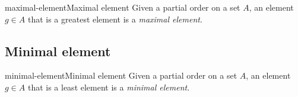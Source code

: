 \documentclass[preview]{standalone}
\begin{document}
\begin{snippetdefinition}{maximal-element}{Maximal element}{
    Given a partial order on a set \(A\), an element \(g\in A\) that is
    a greatest element is a \textit{maximal element}.
}
\end{snippetdefinition}

\subsection{Minimal element}

\begin{snippetdefinition}{minimal-element}{Minimal element}{
    Given a partial order on a set \(A\), an element \(g\in A\) that is
    a least element is a \textit{minimal element}.
}
\end{snippetdefinition}
\end{document}
